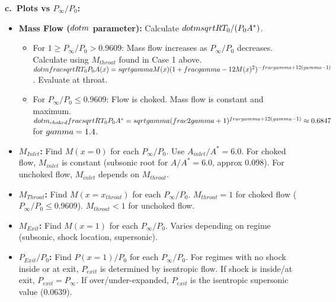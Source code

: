 \textbf{c.~Plots vs \(P_{\infty}/P_0\):}

\begin{itemize}
\tightlist
\item
  \textbf{Mass Flow (\(\\dot{m}\) parameter):} Calculate
  \(\\dot{m} \\sqrt{RT_0}/(P_0 A^*)\).

  \begin{itemize}
  \tightlist
  \item
    For \(1 \ge P_{\infty}/P_0 > 0.9609\): Mass flow increases as
    \(P_{\infty}/P_0\) decreases. Calculate using \(M_{throat}\) found
    in Case 1 above.
    \(\\dot{m} \\frac{\\sqrt{RT_0}}{P_0 A(x)} = \\sqrt{\\gamma} M(x) (1 + \\frac{\\gamma-1}{2} M(x)^2)^{-\\frac{\\gamma+1}{2(\\gamma-1)}}\).
    Evaluate at throat.
  \item
    For \(P_{\infty}/P_0 \le 0.9609\): Flow is choked. Mass flow is
    constant and maximum.
    \(\\dot{m}_{choked} \\frac{\\sqrt{RT_0}}{P_0 A^*} = \\sqrt{\\gamma} (\\frac{2}{\\gamma+1})^{\\frac{\\gamma+1}{2(\\gamma-1)}} \approx 0.6847\)
    for \(\\gamma=1.4\).
  \end{itemize}
\item
  \textbf{\(M_{Inlet}\):} Find \(M(x=0)\) for each \(P_{\infty}/P_0\).
  Use \(A_{inlet}/A^*=6.0\). For choked flow, \(M_{inlet}\) is constant
  (subsonic root for \(A/A^*=6.0\), approx 0.098). For unchoked flow,
  \(M_{inlet}\) depends on \(M_{throat}\).
\item
  \textbf{\(M_{Throat}\):} Find \(M(x=x_{throat})\) for each
  \(P_{\infty}/P_0\). \(M_{throat}=1\) for choked flow
  (\(P_{\infty}/P_0 \le 0.9609\)). \(M_{throat}<1\) for unchoked flow.
\item
  \textbf{\(M_{Exit}\):} Find \(M(x=1)\) for each \(P_{\infty}/P_0\).
  Varies depending on regime (subsonic, shock location, supersonic).
\item
  \textbf{\(P_{Exit}/P_0\):} Find \(P(x=1)/P_0\) for each
  \(P_{\infty}/P_0\). For regimes with no shock inside or at exit,
  \(P_{exit}\) is determined by isentropic flow. If shock is inside/at
  exit, \(P_{exit}=P_{\infty}\). If over/under-expanded, \(P_{exit}\) is
  the isentropic supersonic value (\(0.0639\)).
\end{itemize}

